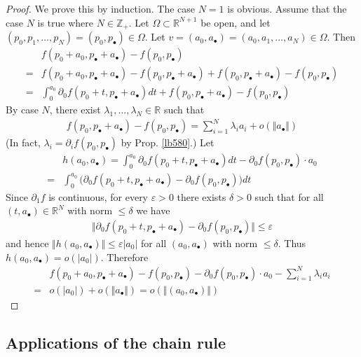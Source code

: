 \documentclass[12pt,b5paper,notitlepage]{article}
\theoremstyle{definition}
\theoremstyle{plain}
\newcommand{\blt}{\bullet}
\newcommand{\Zbb}{\mathbb Z}
\newcommand{\Rbb}{\mathbb R}
\newcommand{\eps}{\varepsilon}
\numberwithin{equation}{section}
\begin{document}
\begin{proof}
We prove this by induction. The case $N=1$ is obvious. Assume that the case $N$ is true where $N\in\Zbb_+$. Let $\Omega\subset \Rbb^{N+1}$ be open, and let $(p_0,p_1,\dots,p_N)=(p_0,p_\blt)\in\Omega$. Let $v=(a_0,a_\blt)=(a_0,a_1,\dots,a_N)\in\Omega$. Then
\begin{align*}
&f(p_0+a_0,p_\blt+a_\blt)-f(p_0,p_\blt)\\
=&f(p_0+a_0,p_\blt+a_\blt)-f(p_0,p_\blt+a_\blt)+f(p_0,p_\blt+a_\blt)-f(p_0,p_\blt)\\
=&\int_{0}^{a_0}\partial_0 f(p_0+t,p_\blt+a_\blt)dt+f(p_0,p_\blt+a_\blt)-f(p_0,p_\blt)
\end{align*}
By case $N$, there exist $\lambda_1,\dots,\lambda_N\in\Rbb$ such that
\begin{align*}
f(p_0,p_\blt+a_\blt)-f(p_0,p_\blt)=\sum_{i=1}^N \lambda_ia_i+o(\Vert a_\blt\Vert)
\end{align*}
(In fact, $\lambda_i=\partial_i f(p_0,p_\blt)$ by Prop. \ref{lb580}.) Let
\begin{align*}
&h(a_0,a_\blt)=\int_{0}^{a_0}\partial_0 f(p_0+t,p_\blt+a_\blt)dt-\partial_0 f(p_0,p_\blt)\cdot a_0\\
=&\int_{0}^{a_0}\big(\partial_0 f(p_0+t,p_\blt+a_\blt)-\partial_0 f(p_0,p_\blt)\big)dt
\end{align*}
Since $\partial_1f$ is continuous, for every $\eps>0$ there exists $\delta>0$ such that for all $(t,a_\blt)\in\Rbb^N$ with norm $\leq \delta$ we have
\begin{align*}
\Vert \partial_0 f(p_0+t,p_\blt+a_\blt)-\partial_0 f(p_0,p_\blt)\Vert\leq\eps
\end{align*}
and hence $\Vert h(a_0,a_\blt)\Vert\leq\eps |a_0|$ for all $(a_0,a_\blt)$ with norm $\leq\delta$. Thus $h(a_0,a_\blt)=o(|a_0|)$. Therefore
\begin{align*}
&f(p_0+a_0,p_\blt+a_\blt)-f(p_0,p_\blt)-\partial_0 f(p_0,p_\blt)\cdot a_0-\sum_{i=1}^N \lambda_ia_i\\
=&o(|a_0|)+o(\Vert a_\blt\Vert)=o(\Vert(a_0,a_\blt)\Vert)
\end{align*}
\end{proof}


\subsection{Applications of the chain rule}
\end{document}
